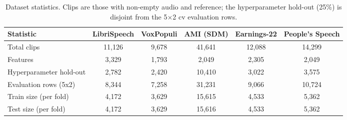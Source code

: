 \begin{table}[t]
    \centering
    \caption{Dataset statistics. Clips are those with non-empty audio and reference; the hyperparameter hold-out (25\%) is disjoint from the 5$\times$2 cv evaluation rows.}
    \label{tab:datasets} \footnotesize \setlength{\tabcolsep}{3pt}
    \begin{adjustbox}{max width=\linewidth}
    \begin{tabular}{lccccc}
        \toprule
        \textbf{Statistic} & \textbf{LibriSpeech} & \textbf{VoxPopuli} & \textbf{AMI (SDM)} & \textbf{Earnings-22} & \textbf{People's Speech} \\
        \midrule
        Total clips & 11,126 & 9,678 & 41,641 & 12,088 & 14,299 \\
        Features & 3,329 & 1,793 & 2,049 & 2,305 & 2,049 \\
        Hyperparameter hold-out & 2,782 & 2,420 & 10,410 & 3,022 & 3,575 \\
        Evaluation rows (5x2) & 8,344 & 7,258 & 31,231 & 9,066 & 10,724 \\
        Train size (per fold) & 4,172 & 3,629 & 15,615 & 4,533 & 5,362 \\
        Test size (per fold) & 4,172 & 3,629 & 15,616 & 4,533 & 5,362 \\
        \bottomrule
    \end{tabular}
    \end{adjustbox}
\end{table}
